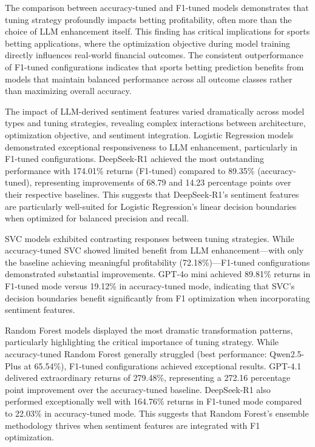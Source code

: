 \documentclass[conference]{IEEEtran}
\begin{document}
The comparison between accuracy-tuned and F1-tuned models demonstrates that tuning strategy profoundly impacts betting profitability, often more than the choice of LLM enhancement itself. This finding has critical implications for sports betting applications, where the optimization objective during model training directly influences real-world financial outcomes. The consistent outperformance of F1-tuned configurations indicates that sports betting prediction benefits from models that maintain balanced performance across all outcome classes rather than maximizing overall accuracy.


The impact of LLM-derived sentiment features varied dramatically across model types and tuning strategies, revealing complex interactions between architecture, optimization objective, and sentiment integration. Logistic Regression models demonstrated exceptional responsiveness to LLM enhancement, particularly in F1-tuned configurations. DeepSeek-R1 achieved the most outstanding performance with 174.01\% returns (F1-tuned) compared to 89.35\% (accuracy-tuned), representing improvements of 68.79 and 14.23 percentage points over their respective baselines. This suggests that DeepSeek-R1's sentiment features are particularly well-suited for Logistic Regression's linear decision boundaries when optimized for balanced precision and recall.

SVC models exhibited contrasting responses between tuning strategies. While accuracy-tuned SVC showed limited benefit from LLM enhancement—with only the baseline achieving meaningful profitability (72.18\%)—F1-tuned configurations demonstrated substantial improvements. GPT-4o mini achieved 89.81\% returns in F1-tuned mode versus 19.12\% in accuracy-tuned mode, indicating that SVC's decision boundaries benefit significantly from F1 optimization when incorporating sentiment features.

Random Forest models displayed the most dramatic transformation patterns, particularly highlighting the critical importance of tuning strategy. While accuracy-tuned Random Forest generally struggled (best performance: Qwen2.5-Plus at 65.54\%), F1-tuned configurations achieved exceptional results. GPT-4.1 delivered extraordinary returns of 279.48\%, representing a 272.16 percentage point improvement over the accuracy-tuned baseline. DeepSeek-R1 also performed exceptionally well with 164.76\% returns in F1-tuned mode compared to 22.03\% in accuracy-tuned mode. This suggests that Random Forest's ensemble methodology thrives when sentiment features are integrated with F1 optimization.
\end{document}
